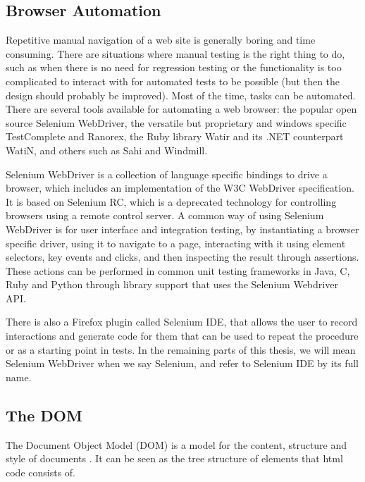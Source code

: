 \documentclass[11pt]{article}
\begin{document}
\subsection{Browser Automation}
\label{sec:browserautomation}

Repetitive manual navigation of a web site is generally boring and time consuming. There are situations where manual testing is the right thing to do, such as when there is no need for regression testing or the functionality is too complicated to interact with for automated tests to be possible (but then the design should probably be improved). Most of the time, tasks can be automated. There are several tools available for automating a web browser: the popular open source Selenium WebDriver, the versatile but proprietary and windows specific TestComplete and Ranorex, the Ruby library Watir and its .NET counterpart WatiN, and others such as Sahi and Windmill.

Selenium WebDriver is a collection of language specific bindings to drive a browser, which includes an implementation of the W3C WebDriver specification. It is based on Selenium RC, which is a deprecated technology for controlling browsers using a remote control server. A common way of using Selenium WebDriver is for user interface and integration testing, by instantiating a browser specific driver, using it to navigate to a page, interacting with it using element selectors, key events and clicks, and then inspecting the result through assertions. These actions can be performed in common unit testing frameworks in Java, C\nolinebreak\hspace{-.05em}\raisebox{.3ex}{\scriptsize\bf \#}, Ruby and Python through library support that uses the Selenium Webdriver API. \cite{Selenium}

There is also a Firefox plugin called Selenium IDE, that allows the user to record interactions and generate code for them that can be used to repeat the procedure or as a starting point in tests. In the remaining parts of this thesis, we will mean Selenium WebDriver when we say Selenium, and refer to Selenium IDE by its full name.

\subsection{The DOM}
\label{sec:dom}

The Document Object Model (DOM) is a model for the content, structure and style of documents \cite{W3CDOM}. It can be seen as the tree structure of elements that html code consists of.
\end{document}
